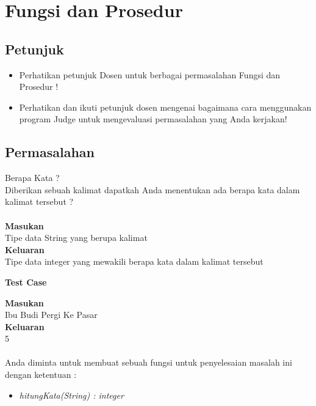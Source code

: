 \chapter{Fungsi dan Prosedur}

\section{Petunjuk}
\begin{itemize}
	\item Perhatikan petunjuk Dosen untuk berbagai permasalahan Fungsi dan Prosedur  !
	\
	\item Perhatikan dan ikuti petunjuk dosen mengenai bagaimana cara menggunakan program Judge untuk mengevaluasi permasalahan yang Anda kerjakan!
\end{itemize}

\pagebreak
\section{Permasalahan}
\begin{permasalahan}{Berapa Kata ?}\\
\label{prob:BerapaKata}
	Diberikan sebuah kalimat dapatkah Anda menentukan ada berapa kata dalam kalimat tersebut ? \\\\
	\textbf{Masukan}\\
	Tipe data String yang berupa kalimat\\
	\textbf{Keluaran}\\
	Tipe data integer yang mewakili berapa kata dalam kalimat tersebut
	\begin{center}
	\textbf{Test Case}\\
	\end{center}
	\textbf{Masukan}\\
	Ibu Budi Pergi Ke Pasar\\
	\textbf{Keluaran}\\
	5
	\\\\
	
	Anda diminta untuk membuat sebuah fungsi untuk penyelesaian masalah ini dengan ketentuan : \\
	\begin{itemize}
		\item \textit{hitungKata(String) : integer}\\
	\end{itemize}
\end{permasalahan}


